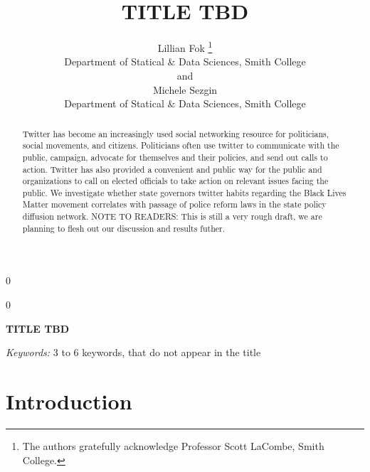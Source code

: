 \documentclass[12pt]{article}
\newcommand{\blind}{0}
\begin{document}
\def\spacingset#1{\renewcommand{\baselinestretch}%
{#1}\small\normalsize} \spacingset{1}



\blind
{
  \title{\bf TITLE TBD}

  \author{
        Lillian Fok \thanks{The authors gratefully acknowledge Professor
Scott LaCombe, Smith College.} \\
    Department of Statical \& Data Sciences, Smith College\\
     and \\     Michele Sezgin \\
    Department of Statical \& Data Sciences, Smith College\\
      }
  \maketitle
} \fi

\blind
{
  \bigskip
  \bigskip
  \bigskip
  \begin{center}
    {\LARGE\bf TITLE TBD}
  \end{center}
  \medskip
} \fi

\bigskip
\begin{abstract}
Twitter has become an increasingly used social networking resource for
politicians, social movements, and citizens. Politicians often use
twitter to communicate with the public, campaign, advocate for
themselves and their policies, and send out calls to action. Twitter has
also provided a convenient and public way for the public and
organizations to call on elected officials to take action on relevant
issues facing the public. We investigate whether state governors twitter
habits regarding the Black Lives Matter movement correlates with passage
of police reform laws in the state policy diffusion network. NOTE TO
READERS: This is still a very rough draft, we are planning to flesh out
our discussion and results futher.
\end{abstract}

\noindent%
{\it Keywords:} 3 to 6 keywords, that do not appear in the title
\vfill

\newpage
\spacingset{1.45} %

\hypertarget{introduction}{%
\section{Introduction}\label{introduction}}
\end{document}
